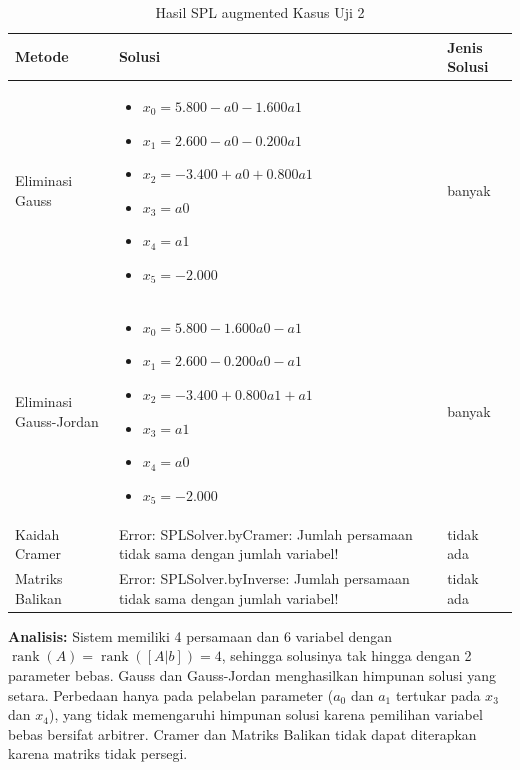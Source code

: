 \documentclass[12pt,a4paper]{report}
\begin{document}
\begin{table}[H]
    \centering
    \caption{Hasil SPL augmented Kasus Uji 2}
    \begin{tabular}{|l|p{5cm}|l|}
        \hline
        \textbf{Metode} & \textbf{Solusi} & \textbf{Jenis Solusi} \\
        \hline
        Eliminasi Gauss & 
        \begin{itemize}
            \item $x_0 = 5.800 - a0 - 1.600a1$
            \item $x_1 = 2.600 - a0 - 0.200a1$
            \item $x_2 = -3.400 + a0 + 0.800a1$
            \item $x_3 = a0$
            \item $x_4 = a1$
            \item $x_5 = -2.000$
        \end{itemize}
        & banyak \\
        \hline
        Eliminasi Gauss-Jordan & 
        \begin{itemize}
            \item $x_0 = 5.800 - 1.600a0 - a1$
            \item $x_1 = 2.600 - 0.200a0 - a1$
            \item $x_2 = -3.400 + 0.800a1 + a1 $
            \item $x_3 = a1$
            \item $x_4 = a0$
            \item $x_5 = -2.000$
        \end{itemize}
        & banyak \\
        \hline
        Kaidah Cramer & 
        Error: SPLSolver.byCramer: Jumlah persamaan tidak sama dengan jumlah variabel!
        & tidak ada  \\
        \hline
        Matriks Balikan & 
        Error: SPLSolver.byInverse: Jumlah persamaan tidak sama dengan jumlah variabel!
        & tidak ada  \\
        \hline
    \end{tabular}
\end{table}

\textbf{Analisis:} Sistem memiliki 4 persamaan dan 6 variabel dengan $\operatorname{rank}(A)=\operatorname{rank}([A|b])=4$, sehingga solusinya tak hingga dengan 2 parameter bebas. Gauss dan Gauss-Jordan menghasilkan himpunan solusi yang setara. Perbedaan hanya pada pelabelan parameter ($a_0$ dan $a_1$ tertukar pada $x_3$ dan $x_4$), yang tidak memengaruhi himpunan solusi karena pemilihan variabel bebas bersifat arbitrer. Cramer dan Matriks Balikan tidak dapat diterapkan karena matriks tidak persegi.
\end{document}
